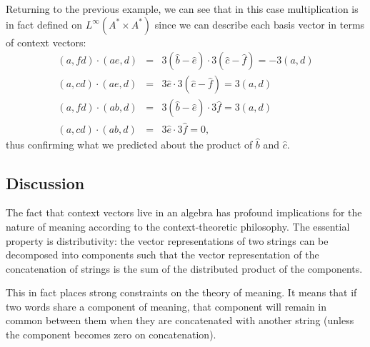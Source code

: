 
Returning to the previous example, we can see that in this case multiplication is in fact defined on $L^\infty(A^*\times A^*)$ since we can describe each basis vector in terms of context vectors:
\begin{eqnarray*}
(a,fd)\cdot(ae,d) &=& 3(\hat{b} - \hat{e})\cdot 3(\hat{c} - \hat{f}) = -3(a,d)\\
(a,cd)\cdot(ae,d) &=& 3\hat{e}\cdot 3(\hat{c} - \hat{f}) = 3(a,d)\\
(a,fd)\cdot(ab,d) &=& 3(\hat{b} - \hat{e})\cdot 3\hat{f} = 3(a,d)\\
(a,cd)\cdot(ab,d) &=& 3\hat{e}\cdot 3\hat{f} = 0,
\end{eqnarray*}
thus confirming what we predicted about the product of $\hat{b}$ and $\hat{c}$.


\subsection{Discussion}

The fact that context vectors live in an algebra has profound implications for the nature of meaning according to the context-theoretic philosophy. The essential property is distributivity: the vector representations of two strings can be decomposed into components such that the vector representation of the concatenation of strings is the sum of the distributed product of the components.

This in fact places strong constraints on the theory of meaning. It means that if two words share a component of meaning, that component will remain in common between them when they are concatenated with another string (unless the component becomes zero on concatenation).

